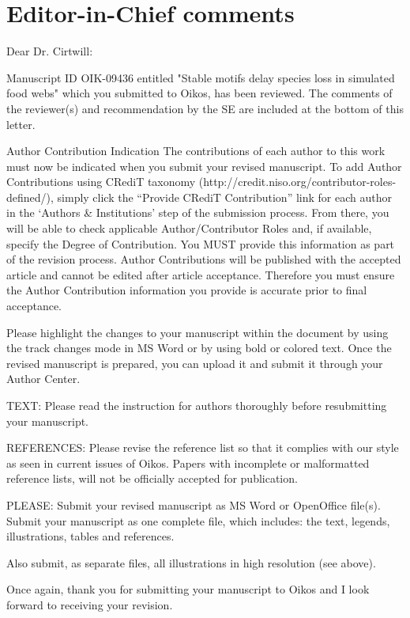 \documentclass[12pt]{article}
\begin{document}
\section*{Editor-in-Chief comments}

  Dear Dr. Cirtwill:

  Manuscript ID OIK-09436 entitled "Stable motifs delay species loss in simulated food webs" which you submitted to Oikos, has been reviewed.  The comments of the reviewer(s) and recommendation by the SE are included at the bottom of this letter.


  Author Contribution Indication
  The contributions of each author to this work must now be indicated when you submit your revised manuscript. To add Author Contributions using CRediT taxonomy (http://credit.niso.org/contributor-roles-defined/), simply click the “Provide CRediT Contribution” link for each author in the ‘Authors \& Institutions’ step of the submission process. From there, you will be able to check applicable Author/Contributor Roles and, if available, specify the Degree of Contribution. You MUST provide this information as part of the revision process. Author Contributions will be published with the accepted article and cannot be edited after article acceptance. Therefore you must ensure the Author Contribution information you provide is accurate prior to final acceptance.


  Please highlight the changes to your manuscript within the document by using the track changes mode in MS Word or by using bold or colored text. Once the revised manuscript is prepared, you can upload it and submit it through your Author Center.


  TEXT: Please read the instruction for authors thoroughly before resubmitting your manuscript.

  REFERENCES: Please revise the reference list so that it complies with our style as seen in current issues of Oikos. Papers with incomplete or malformatted reference lists, will not be officially accepted for publication.

  PLEASE: Submit your revised manuscript as MS Word or OpenOffice file(s). Submit your manuscript as one complete file, which includes: the text, legends, illustrations, tables and references.

  Also submit, as separate files, all illustrations in high resolution (see above).

  Once again, thank you for submitting your manuscript to Oikos and I look forward to receiving your revision.
\end{document}
